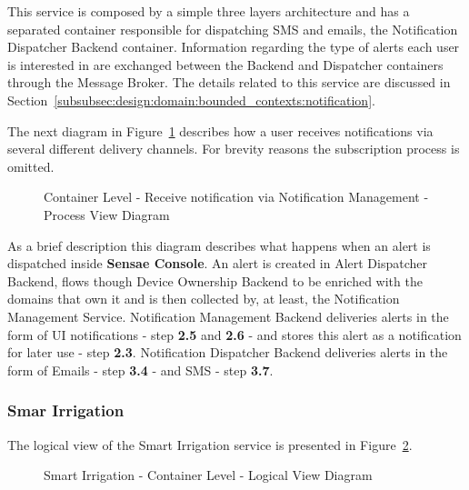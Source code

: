 This service is composed by a simple three layers architecture and has a separated container responsible for dispatching SMS and emails, the Notification Dispatcher Backend container. Information regarding the type of alerts each user is interested in are exchanged between the Backend and Dispatcher containers through the Message Broker. The details related to this service are discussed in Section~\ref{subsubsec:design:domain:bounded_contexts:notification}.

The next diagram in Figure~\ref{fig:design:architecture:container:process:diagram:notification} describes how a user receives notifications via several different delivery channels. For brevity reasons the subscription process is omitted.

\begin{figure}[H]
   \centering
   \resizebox{\columnwidth}{!}
   {
      
   }
   \caption[Container Level - Receive notification via Notification Management - Process View Diagram]{Container Level - Receive notification via Notification Management - Process View Diagram}
   \label{fig:design:architecture:container:process:diagram:notification}
\end{figure}

As a brief description this diagram describes what happens when an alert is dispatched inside \textbf{Sensae Console}. An alert is created in Alert Dispatcher Backend, flows though Device Ownership Backend to be enriched with the domains that own it and is then collected by, at least, the Notification Management Service. Notification Management Backend deliveries alerts in the form of \gls{UI} notifications - step \textbf{2.5} and \textbf{2.6} - and stores this alert as a notification for later use - step \textbf{2.3}. Notification Dispatcher Backend deliveries alerts in the form of Emails - step \textbf{3.4} - and SMS - step \textbf{3.7}.

\subsubsection{Smar Irrigation}
\label{subsubsec:design:architecture:solutions:irrigation}

The logical view of the Smart Irrigation service is presented in Figure~\ref{fig:design:architecture:solutions:containers:logical:irrigation}.

\begin{figure}[H]
   \centering
   \resizebox{0.75\columnwidth}{!}
       {
       
       }
   \caption[Smart Irrigation - Container Level - Logical View Diagram]{Smart Irrigation - Container Level - Logical View Diagram}
   \label{fig:design:architecture:solutions:containers:logical:irrigation}
\end{figure}

